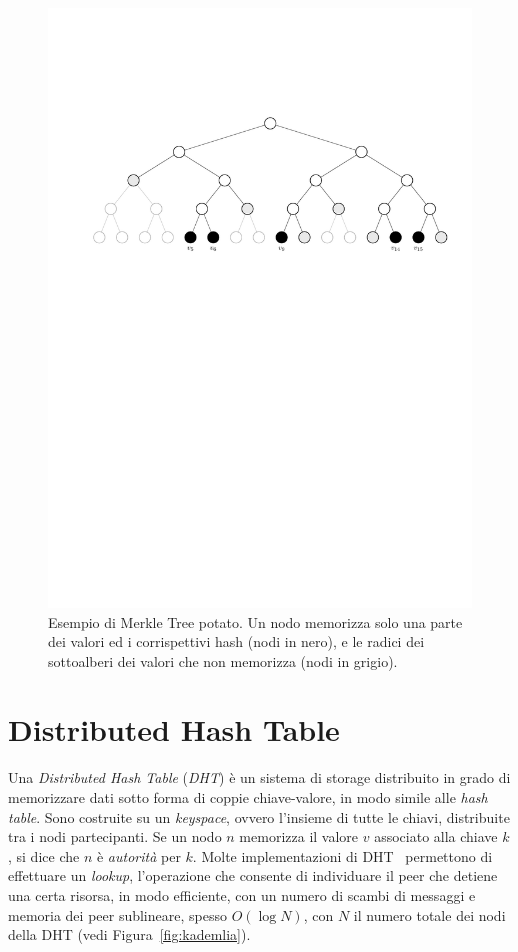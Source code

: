 \begin{figure}
	\centering
	\includegraphics[scale=0.8]{img/capuno/pruned_mht.pdf}
	\caption{Esempio di Merkle Tree potato. Un nodo memorizza solo una parte dei valori ed i corrispettivi hash (nodi in nero), e le radici dei sottoalberi dei valori che non memorizza (nodi in grigio).}
	\label{fig:pruning}
\end{figure}

\section{Distributed Hash Table}

Una \textit{Distributed Hash Table} (\textit{DHT}) è un sistema di storage distribuito in grado di memorizzare dati sotto forma di coppie chiave-valore, in modo simile alle \emph{hash table}. Sono costruite su un \emph{keyspace}, ovvero l'insieme di tutte le chiavi, distribuite tra i nodi partecipanti. Se un nodo $n$ memorizza il valore $v$ associato alla chiave $k$, si dice che $n$ è \emph{autorità} per $k$. Molte implementazioni di DHT~\cite{maymounkov2002kademlia, ratnasamy2001scalable, stoica2001chord, zhao2004tapestry} permettono di effettuare un \emph{lookup}, l'operazione che consente di individuare il peer che detiene una certa risorsa, in modo efficiente, con un numero di scambi di messaggi e memoria dei peer sublineare, spesso $O(\log N)$, con $N$ il numero totale dei nodi della DHT (vedi Figura~\ref{fig:kademlia}).

